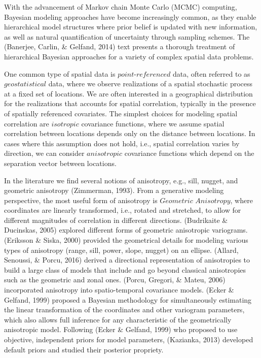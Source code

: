 \documentclass[12pt,twoside]{dukestatscithesis}
\theoremstyle{definition}
\theoremstyle{definition}
\theoremstyle{definition}
\theoremstyle{remark}
\begin{document}
With the advancement of Markov chain Monte Carlo (MCMC) computing,
Bayesian modeling approaches have become increasingly common, as they
enable hierarchical model structures where prior belief is updated with
new information, as well as natural quantification of uncertainty
through sampling schemes. The (Banerjee, Carlin, \& Gelfand, 2014) text
presents a thorough treatment of hierarchical Bayesian approaches for a
variety of complex spatial data problems.

One common type of spatial data is \(\textit{point-referenced}\) data,
often referred to as \(\textit{geostatistical}\) data, where we observe
realizations of a spatial stochastic process at a fixed set of
locations. We are often interested in a geographical distribution for
the realizations that accounts for spatial correlation, typically in the
presence of spatially referenced covariates. The simplest choices for
modeling spatial correlation are \(\textit{isotropic}\) covariance
functions, where we assume spatial correlation between locations depends
only on the distance between locations. In cases where this assumption
does not hold, i.e., spatial correlation varies by direction, we can
consider \(\textit{anisotropic}\) covariance functions which depend on
the separation vector between locations.

In the literature we find several notions of anisotropy, e.g., sill,
nugget, and geometric anisotropy (Zimmerman, 1993). From a generative
modeling perspective, the most useful form of anisotropy is
\(\textit{Geometric Anisotropy}\), where coordinates are linearly
transformed, i.e., rotated and stretched, to allow for different
magnitudes of correlation in different directions. (Budrikaite \&
Ducinskas, 2005) explored different forms of geometric anisotropic
variograms. (Eriksson \& Siska, 2000) provided the geometrical details
for modeling various types of anisotropy (range, sill, power, slope,
nugget) on an ellipse. (Allard, Senoussi, \& Porcu, 2016) derived a
directional representation of anisotropies to build a large class of
models that include and go beyond classical anisotropies such as the
geometric and zonal ones. (Porcu, Gregori, \& Mateu, 2006) incorporated
anisotropy into spatio-temporal covariance models. (Ecker \& Gelfand,
1999) proposed a Bayesian methodology for simultaneously estimating the
linear transformation of the coordinates and other variogram parameters,
which also allows full inference for any characteristic of the
geometrically anisotropic model. Following (Ecker \& Gelfand, 1999) who
proposed to use objective, independent priors for model parameters,
(Kazianka, 2013) developed default priors and studied their posterior
propriety.
\end{document}

